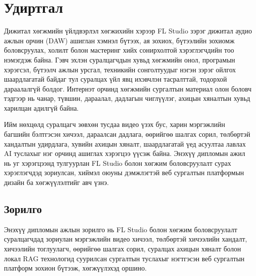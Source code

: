 
\chapter{Удиртгал}
\label{ChapterIntro}

Дижитал хөгжмийн үйлдвэрлэл хөгжихийн хэрээр FL Studio зэрэг дижитал аудио ажлын орчин (DAW) ашиглан хэмнэл бүтээх, ая зохиох, бүтээлийн зохиомж боловсруулах, холилт болон мастеринг хийх сонирхолтой хэрэглэгчдийн тоо нэмэгдэж байна. Гэвч эхлэн суралцагчдын хувьд хөгжмийн онол, програмын хэрэгсэл, бүтээлч ажлын урсгал, техникийн сонголтуудыг нэгэн зэрэг ойлгох шаардлагатай байдаг тул суралцах үйл явц ихэвчлэн тасралттай, тодорхой дараалалгүй болдог. Интернэт орчинд хөгжмийн сургалтын материал олон боловч тэдгээр нь чанар, түвшин, дараалал, дадлагын чиглүүлэг, ахицын хяналтын хувьд харилцан адилгүй байна.

Ийм нөхцөлд суралцагч зөвхөн тусдаа видео үзэх бус, харин мэргэжлийн багшийн бэлтгэсэн хичээл, дараалсан дадлага, өөрийгөө шалгах сорил, төлбөртэй хандалтын удирдлага, хувийн ахицын хяналт, шаардлагатай үед асуултаа лавлах AI туслахыг нэг орчинд ашиглах хэрэгцээ үүсэж байна. Энэхүү дипломын ажил нь уг хэрэгцээнд тулгуурлан FL Studio болон хөгжим боловсруулалт сурах хэрэглэгчдэд зориулсан, хиймэл оюуны дэмжлэгтэй веб сургалтын платформын дизайн ба хөгжүүлэлтийг авч үзнэ.

\section*{Зорилго}
Энэхүү дипломын ажлын зорилго нь FL Studio болон хөгжим боловсруулалт суралцагчдад зориулан мэргэжлийн видео хичээл, төлбөртэй хичээлийн хандалт, хичээлийн тоглуулагч, өөрийгөө шалгах сорил, суралцах ахицын хяналт болон локал RAG технологид суурилсан сургалтын туслахыг нэгтгэсэн веб сургалтын платформ зохион бүтээж, хөгжүүлэхэд оршино.

